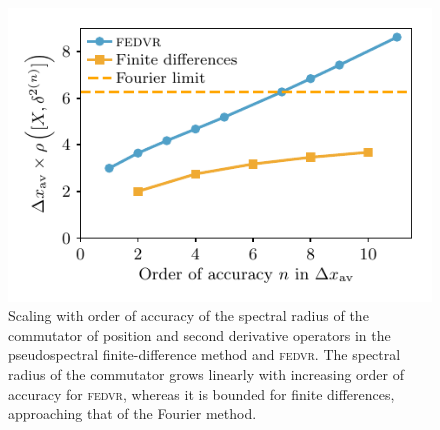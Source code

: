 \begin{figure}[t]
    \centerfloat
    \includegraphics{figures/numerics/fedvr_commutation_error_scaling.pdf}
    \caption{Scaling with order of accuracy of the spectral radius of the commutator of position and second derivative operators in the pseudospectral finite-difference method and \textsc{fedvr}. The spectral radius of the commutator grows linearly with increasing order of accuracy for \textsc{fedvr}, whereas it is bounded for finite differences, approaching that of the Fourier method.}
    \label{fig:fedvr_commutation_error_scaling}
\end{figure}

